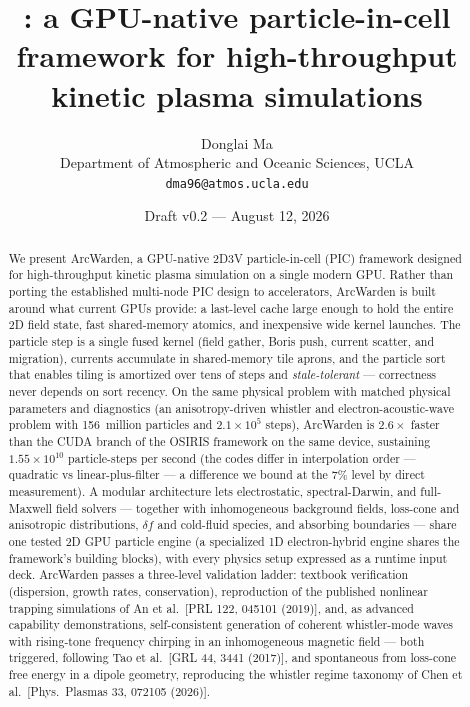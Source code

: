 \documentclass[11pt]{article}
\title{\arcw: a GPU-native particle-in-cell framework for high-throughput
  kinetic plasma simulations}
\author{Donglai Ma\\
  \small Department of Atmospheric and Oceanic Sciences, UCLA\\
  \small \texttt{dma96@atmos.ucla.edu}}
\date{Draft v0.2 --- August 12, 2026}
\newcommand{\arcw}{ArcWarden}
\begin{document}
\maketitle

\begin{abstract}
We present \arcw, a GPU-native 2D3V particle-in-cell (PIC) framework
designed for high-throughput kinetic plasma simulation on a single modern
GPU. Rather than porting the established multi-node PIC design to
accelerators, \arcw{} is built around what current GPUs provide: a
last-level cache large enough to hold the entire 2D field state, fast
shared-memory atomics, and inexpensive wide kernel launches. The particle
step is a single fused kernel (field gather, Boris push, current scatter,
and migration), currents accumulate in shared-memory tile aprons, and the
particle sort that enables tiling is amortized over tens of steps and
\emph{stale-tolerant} --- correctness never depends on sort recency. On
the same physical problem with matched physical parameters and diagnostics
(an anisotropy-driven whistler and electron-acoustic-wave problem with
156~million particles and $2.1\times10^{5}$ steps), \arcw{} is $2.6\times$
faster than the CUDA branch of the OSIRIS framework on the same device,
sustaining $1.55\times10^{10}$ particle-steps per second (the codes differ
in interpolation order --- quadratic vs linear-plus-filter --- a difference
we bound at the 7\% level by direct measurement).
A modular architecture lets electrostatic, spectral-Darwin, and
full-Maxwell field solvers --- together with inhomogeneous background
fields, loss-cone and anisotropic distributions, $\delta f$ and cold-fluid
species, and absorbing boundaries --- share one tested 2D GPU particle
engine (a specialized 1D electron-hybrid engine shares the framework's
building blocks), with every physics setup expressed as a runtime input
deck.
\arcw{} passes a three-level validation ladder: textbook verification
(dispersion, growth rates, conservation), reproduction of the published
nonlinear trapping simulations of An et al.\ [PRL 122, 045101 (2019)],
and, as advanced capability demonstrations, self-consistent generation
of coherent whistler-mode waves with rising-tone frequency chirping in an
inhomogeneous magnetic field --- both triggered, following Tao et al.\
[GRL 44, 3441 (2017)], and spontaneous from loss-cone free energy in a
dipole geometry, reproducing the whistler regime taxonomy of Chen et al.\
[Phys.\ Plasmas 33, 072105 (2026)].
\end{abstract}
\end{document}
